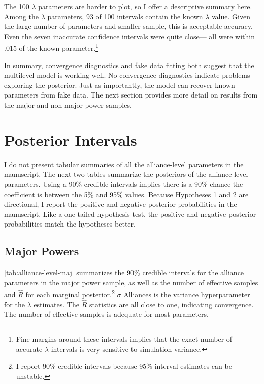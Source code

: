 \documentclass[12pt]{article}
\begin{document}
 
The 100 $\lambda$ parameters are harder to plot, so I offer a descriptive summary here. 
Among the $\lambda$ parameters, 93 of 100 intervals contain the known $\lambda$ value.
Given the large number of parameters and smaller sample, this is acceptable accuracy. 
Even the seven inaccurate confidence intervals were quite close--- all were within .015 of the known parameter.\footnote{Fine margins around these intervals implies that the exact number of accurate $\lambda$ intervals is very sensitive to simulation variance.}


In summary, convergence diagnostics and fake data fitting both suggest that the multilevel model is working well. 
No convergence diagnostics indicate problems exploring the posterior. 
Just as importantly, the model can recover known parameters from fake data. 
The next section provides more detail on results from the major and non-major power samples. 



\section{Posterior Intervals} 


I do not present tabular summaries of all the alliance-level parameters in the manuscript. 
The next two tables summarize the posteriors of the alliance-level parameters. 
Using a 90\% credible intervals implies there is a 90\% chance the coefficient is between the 5\% and 95\% values. 
Because Hypotheses 1 and 2 are directional, I report the positive and negative posterior probabilities in the manuscript.  
Like a one-tailed hypothesis test, the positive and negative posterior probabilities match the hypotheses better. 

\subsection{Major Powers}


\autoref{tab:alliance-level-maj} summarizes the 90\% credible intervals for the alliance parameters in the major power sample, as well as the number of effective samples and $\hat{R}$ for each marginal posterior.\footnote{I report 90\% credible intervals because 95\% interval estimates can be unstable.} 
$\sigma$ Alliances is the variance hyperparameter for the $\lambda$ estimates. 
The $\hat{R}$ statistics are all close to one, indicating convergence. 
The number of effective samples is adequate for most parameters. 
\end{document}
